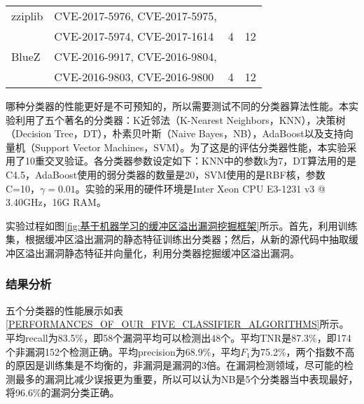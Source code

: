 {\begin{table}[ht]
\begin{center}
\begin{small}
\begin{tabular}{llll}
zziplib & CVE-2017-5976, CVE-2017-5975,\\ & CVE-2017-5974, CVE-2017-1614 & 4 & 12\\ \hline

BlueZ & CVE-2016-9917, CVE-2016-9804,\\ & CVE-2016-9803,  CVE-2016-9800 & 4 & 12\\ \hline
\end{tabular}
\end{small}
\end{center}
\end{table}

哪种分类器的性能更好是不可预知的，所以需要测试不同的分类器算法性能。本实验利用了五个著名的分类器：K近邻法（K-Nearest Neighbors，KNN），决策树（Decision Tree，DT），朴素贝叶斯（Naive Bayes，NB），AdaBoost以及支持向量机（Support Vector Machines，SVM）。为了这是的评估分类器性能，本实验采用了10重交叉验证。各分类器参数设定如下：KNN中的参数k为7，DT算法用的是C4.5，AdaBoost使用的弱分类器的数量是20，SVM使用的是RBF核，参数C=10，$\gamma = 0.01$。实验的采用的硬件环境是Inter Xeon CPU E3-1231 v3 @ 3.40GHz，16G RAM。

实验过程如图\ref{fig:基于机器学习的缓冲区溢出漏洞挖掘框架}所示。首先，利用训练集，根据缓冲区溢出漏洞的静态特征训练出分类器；然后，从新的源代码中抽取缓冲区溢出漏洞静态特征并向量化，利用分类器挖掘缓冲区溢出漏洞。

\subsubsection{结果分析}

五个分类器的性能展示如表\ref{PERFORMANCES_OF_OUR_FIVE_CLASSIFIER_ALGORITHMS}所示。平均recall为83.5\%，即58个漏洞平均可以检测出48个。平均TNR是87.3\%，即174个非漏洞152个检测正确。平均precision为68.9\%，平均$F_1$为75.2\%，两个指数不高的原因是训练集是不均衡的，非漏洞是漏洞的3倍。在漏洞检测领域，尽可能的检测最多的漏洞比减少误报更为重要，所以可以认为NB是5个分类器当中表现最好，将96.6\%的漏洞分类正确。

}

